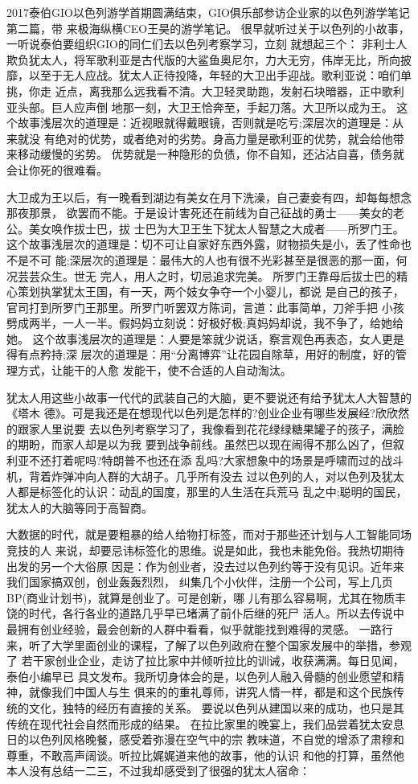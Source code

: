 \documentclass[11pt]{ctexart}
\begin{document}
{{{{2017泰伯GIO以色列游学首期圆满结束，GIO俱乐部参访企业家的以色列游学笔记第二篇，带
来极海纵横CEO王昊的游学笔记。
很早就听过关于以色列的小故事，一听说泰伯要组织GIO的同仁们去以色列考察学习，立刻
就想起三个：
非利士人欺负犹太人，将军歌利亚是古代版的大鲨鱼奥尼尔，力大无穷，伟岸无比，所向披
靡，以至于无人应战。犹太人正待投降，年轻的大卫出手迎战。歌利亚说：咱们单挑，你走
近点，离我那么远我看不清。大卫轻灵助跑，发射石块暗器，正中歌利亚头部。巨人应声倒
地那一刻，大卫王恰奔至，手起刀落。大卫所以成为王。
这个故事浅层次的道理是：近视眼就得戴眼镜，否则就是吃亏;深层次的道理是：从来就没
有绝对的优势，或者绝对的劣势。身高力量是歌利亚的优势，就会给他带来移动缓慢的劣势。
优势就是一种隐形的负债，你不自知，还沾沾自喜，债务就会让你死的很难看。

大卫成为王以后，有一晚看到湖边有美女在月下洗澡，自己妻妾有四，却每每想念那夜那景，
欲罢而不能。于是设计害死还在前线为自己征战的勇士——美女的老公。美女唤作拔士巴，拔
士巴为大卫王生下犹太人智慧之大成者——所罗门王。
这个故事浅层次的道理是：切不可让自家好东西外露，财物损失是小，丢了性命也不是不可
能;深层次的道理是：最伟大的人也有很不光彩甚至是很恶的那一面，何况芸芸众生。世无
完人，用人之时，切忌追求完美。
所罗门王靠母后拔士巴的精心策划执掌犹太王国，有一天，两个妓女争夺一个小婴儿，都说
是自己的孩子，官司打到所罗门王那里。所罗门听罢双方陈词，言道：此事简单，刀斧手把
小孩劈成两半，一人一半。假妈妈立刻说：好极好极;真妈妈却说，我不争了，给她给她。
这个故事浅层次的道理是：人要是笨就少说话，察言观色再表态，女人更是得有点矜持;深
层次的道理是：用“分离博弈”让花园自除草，用好的制度，好的管理方式，让能干的人愈
发能干，使不合适的人自动淘汰。

犹太人用这些小故事一代代的武装自己的大脑，更不要说还有给予犹太人大智慧的《塔木
德》。可是我还是在想现代以色列是怎样的?创业企业有哪些发展经?欣欣然的跟家人里说要
去以色列考察学习了，我像看到花花绿绿糖果罐子的孩子，满脸的期盼，而家人却是以为我
要到战争前线。虽然巴以现在闹得不那么凶了，但叙利亚不还打着呢吗?特朗普不也还在添
乱吗?大家想象中的场景是呼啸而过的战斗机，背着炸弹冲向人群的大胡子。几乎所有没去
过以色列的人，对以色列及犹太人都是标签化的认识：动乱的国度，那里的人生活在兵荒马
乱之中;聪明的国民，犹太人的大脑等同于高智商。

大数据的时代，就是要粗暴的给人给物打标签，而对于那些还计划与人工智能同场竞技的人
来说，却要忌讳标签化的思维。说是如此，我也未能免俗。我热切期待出发的另一个大俗原
因是：作为创业者，没去过以色列约等于没有见识。近年来我们国家搞双创，创业轰轰烈烈，
纠集几个小伙伴，注册一个公司，写上几页BP(商业计划书)，就算是创业了。可是创新，哪
儿有那么容易啊，尤其在物质丰饶的时代，各行各业的道路几乎早已堵满了前仆后继的死尸
活人。所以去传说中最拥有创业经验，最会创新的人群中看看，似乎就能找到难得的灵感。
一路行来，听了大学里面创业的课程，了解了以色列政府在整个国家发展中的举措，参观了
若干家创业企业，走访了拉比家中并倾听拉比的训诫，收获满满。每日见闻，泰伯小编早已
具文发布。我所切身体会的是，以色列人融入骨髓的创业愿望和精神，就像我们中国人与生
俱来的的重礼尊师，讲究人情一样，都是和这个民族传统的文化，独特的经历有直接的关系。
要说以色列从建国以来的成功，也只是其传统在现代社会自然而形成的结果。
在拉比家里的晚宴上，我们品尝着犹太安息日的以色列风格晚餐，感受着弥漫在空气中的宗
教味道，不自觉的增添了肃穆和尊重，不敢高声阔谈。听拉比娓娓道来他的故事，他的认识
和他的打算，虽然他本人没有总结一二三，不过我却感受到了很强的犹太人宿命：

}}}}
\end{document}

